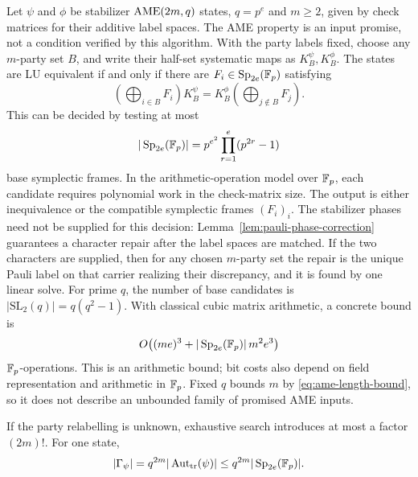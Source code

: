 \begin{corollary}
\label{cor:finite-recognition}
Let \(\psi\) and \(\phi\) be stabilizer \(\mathrm{AME}(2m,q)\) states,
\(q=p^e\) and \(m\geq2\), given by check matrices for their additive
label spaces.  The AME property is an input promise, not a condition
verified by this algorithm.  With the party labels fixed, choose any \(m\)-party set
\(B\), and write their half-set systematic maps as
\(K_B^\psi,K_B^\phi\).  The states are LU equivalent if and only if
there are \(F_i\in\operatorname{Sp}_{2e}(\mathbb F_p)\) satisfying
\begin{equation}
 \left(\bigoplus_{i\in B}F_i\right)K_B^\psi
 =K_B^\phi\left(\bigoplus_{j\notin B}F_j\right).       \label{eq:systematic-orbit-equation}
\end{equation}
This can be decided by testing at most
\[
 |\operatorname{Sp}_{2e}(\mathbb F_p)|
 =p^{e^2}\prod_{r=1}^e(p^{2r}-1)
\]
base symplectic frames.  In the arithmetic-operation model over \(\mathbb F_p\),
each candidate requires polynomial work in the check-matrix size.  The output is either
inequivalence or the compatible symplectic frames \((F_i)_i\).
The stabilizer phases need not be supplied for this decision:
Lemma~\ref{lem:pauli-phase-correction} guarantees a character repair after
the label spaces are matched.  If the two characters are supplied, then for
any chosen \(m\)-party set the repair is the unique Pauli label on that
carrier realizing their discrepancy, and it is found by one linear solve.
For prime \(q\),
the number of base candidates is
\(|\mathrm{SL}_2(q)|=q(q^2-1)\).
With classical cubic matrix arithmetic, a concrete bound is
\[
 O\!\left((me)^3+
 |\operatorname{Sp}_{2e}(\mathbb F_p)|\,m^2e^3\right)
\]
\(\mathbb F_p\)-operations.  This is an arithmetic bound; bit costs also depend
on field representation and arithmetic in \(\mathbb F_p\).  Fixed \(q\) bounds
\(m\) by \eqref{eq:ame-length-bound}, so it does not describe an
unbounded family of promised AME inputs.

If the party relabelling is unknown, exhaustive search introduces at most a
factor \((2m)!\).  For one state,
\[
 |\Gamma_\psi|
 =q^{2m}|\operatorname{Aut}_{\mathrm{tr}}(\psi)|
 \leq q^{2m}|\operatorname{Sp}_{2e}(\mathbb F_p)|.
\]
\end{corollary}


